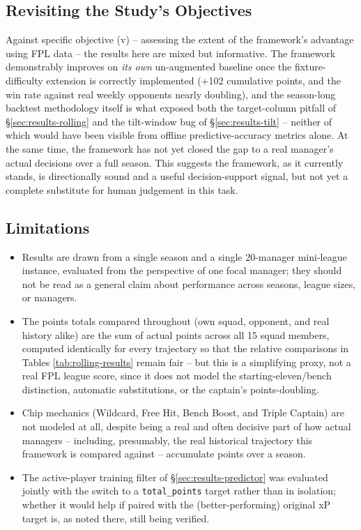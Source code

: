 			\subsection{Revisiting the Study's Objectives}
				Against specific objective (v) -- assessing the extent of the framework's advantage using FPL data -- the results here are mixed but informative. The framework demonstrably improves on \emph{its own} un-augmented baseline once the fixture-difficulty extension is correctly implemented (+102 cumulative points, and the win rate against real weekly opponents nearly doubling), and the season-long backtest methodology itself is what exposed both the target-column pitfall of \S\ref{sec:results-rolling} and the tilt-window bug of \S\ref{sec:results-tilt} -- neither of which would have been visible from offline predictive-accuracy metrics alone. At the same time, the framework has not yet closed the gap to a real manager's actual decisions over a full season. This suggests the framework, as it currently stands, is directionally sound and a useful decision-support signal, but not yet a complete substitute for human judgement in this task.

			\subsection{Limitations}
				\begin{itemize}
					\item Results are drawn from a single season and a single 20-manager mini-league instance, evaluated from the perspective of one focal manager; they should not be read as a general claim about performance across seasons, league sizes, or managers.
					\item The points totals compared throughout (own squad, opponent, and real history alike) are the sum of actual points across all 15 squad members, computed identically for every trajectory so that the relative comparisons in Tables \ref{tab:rolling-results} remain fair -- but this is a simplifying proxy, not a real FPL league score, since it does not model the starting-eleven/bench distinction, automatic substitutions, or the captain's points-doubling.
					\item Chip mechanics (Wildcard, Free Hit, Bench Boost, and Triple Captain) are not modeled at all, despite being a real and often decisive part of how actual managers -- including, presumably, the real historical trajectory this framework is compared against -- accumulate points over a season.
					\item The active-player training filter of \S\ref{sec:results-predictor} was evaluated jointly with the switch to a \texttt{total\_points} target rather than in isolation; whether it would help if paired with the (better-performing) original xP target is, as noted there, still being verified.
				\end{itemize}

